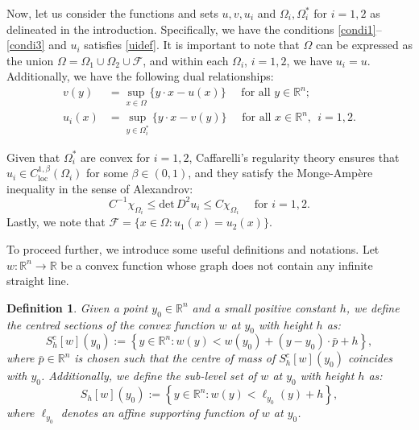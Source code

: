 \documentclass[11pt]{amsart}
\theoremstyle{plain}
\newtheorem{definition}{Definition}[section]
\renewcommand{\det}{\mbox{det}}
\newcommand{\0}{\textbf{0}}
\numberwithin{equation}{section}
\numberwithin{equation}{section}
\numberwithin{figure}{section}
\begin{document}
Now,
let us consider the functions and sets $u, v, u_i$ and $\Omega_i, \Omega^*_i$ for $i=1, 2$ as delineated in the introduction. 
Specifically, we have the conditions \eqref{condi1}--\eqref{condi3} and $u_i$ satisfies \eqref{uidef}. 
It is important to note that $\Omega$ can be expressed as the union $\Omega = \Omega_1\cup \Omega_2\cup\mathcal{F}$, and within each $\Omega_i$, $i=1,2$, we have $u_i = u$. 
Additionally, we have the following dual relationships:
\begin{align}
	 v(y) &= \sup_{x\in \Omega}\{y\cdot x - u(x)\} \quad \text{ for all } y\in \mathbb{R}^n; \label{dual111} \\
	 u_i(x) &= \sup_{y\in \Omega_i^*}\{y\cdot x - v(y)\} \quad \text{ for all } x\in \mathbb{R}^n,\ \ i=1,2. \label{dual222}
\end{align} 

Given that $\Omega^*_i$ are convex for $i=1, 2$, Caffarelli's regularity theory \cite{C92} ensures that $u_i\in C^{1,\beta}_{\text{loc}}(\Omega_i)$ for some $\beta\in(0,1)$, and they satisfy the Monge-Ampère inequality in the sense of Alexandrov:
\begin{equation}\label{Asolv} 
    C^{-1}\chi_{\Omega_i} \leq \det\, D^2 u_i \leq C\chi_{\Omega_i} \quad \text{ for } i=1, 2.
\end{equation}
Lastly, we note that $\mathcal{F}=\{x\in\Omega: u_1(x)=u_2(x)\}$.


To proceed further, we introduce some useful definitions and notations.
Let $w:\mathbb{R}^n\rightarrow \mathbb{R}$ be a convex function whose graph does not contain any infinite straight line.

\begin{definition}\label{defS}
Given a point $y_0\in \mathbb{R}^n$ and a small positive constant $h$, we define the centred sections of the convex function $w$ at $y_0$ with height $h$ as:
\begin{equation}\label{sect}
S^c_{h}[w](y_0) := \left\{y\in\mathbb{R}^n : w(y) < w(y_0) + (y-y_0)\cdot \bar{p} + h\right\},
\end{equation}
where $\bar{p}\in \mathbb{R}^n$ is chosen such that the centre of mass of $S^c_{h}[w](y_0)$ coincides with $y_0$.
Additionally, we define the sub-level set of $w$ at $y_0$ with height $h$ as:
\begin{equation}\label{sub}
S_h[w](y_0) := \left\{y\in \mathbb{R}^n : w(y) < \ell_{y_0}(y) + h\right\},
\end{equation}
where $\ell_{y_0}$ denotes an affine supporting function of $w$ at $y_0$.
\end{definition}
\end{document}
